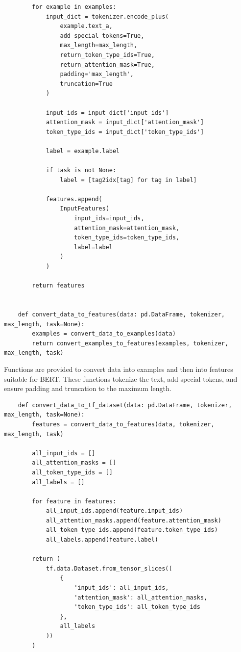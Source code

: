\documentclass{solutionclass} %
\begin{document}
\begin{solution}
\begin{lstlisting}
        for example in examples:
            input_dict = tokenizer.encode_plus(
                example.text_a,
                add_special_tokens=True,
                max_length=max_length,
                return_token_type_ids=True,
                return_attention_mask=True,
                padding='max_length',
                truncation=True
            )
            
            input_ids = input_dict['input_ids']
            attention_mask = input_dict['attention_mask']
            token_type_ids = input_dict['token_type_ids']
            
            label = example.label
            
            if task is not None:
                label = [tag2idx[tag] for tag in label]
            
            features.append(
                InputFeatures(
                    input_ids=input_ids,
                    attention_mask=attention_mask,
                    token_type_ids=token_type_ids,
                    label=label
                )
            )
            
        return features
    
    
    def convert_data_to_features(data: pd.DataFrame, tokenizer, max_length, task=None):
        examples = convert_data_to_examples(data)
        return convert_examples_to_features(examples, tokenizer, max_length, task)
    \end{lstlisting}
    
    Functions are provided to convert data into examples and then into features suitable for BERT. These functions tokenize the text, add special tokens, and ensure padding and truncation to the maximum length.
    
    \begin{lstlisting}
    def convert_data_to_tf_dataset(data: pd.DataFrame, tokenizer, max_length, task=None):
        features = convert_data_to_features(data, tokenizer, max_length, task)
        
        all_input_ids = []
        all_attention_masks = []
        all_token_type_ids = []
        all_labels = []
        
        for feature in features:
            all_input_ids.append(feature.input_ids)
            all_attention_masks.append(feature.attention_mask)
            all_token_type_ids.append(feature.token_type_ids)
            all_labels.append(feature.label)
            
        return (
            tf.data.Dataset.from_tensor_slices((
                {
                    'input_ids': all_input_ids,
                    'attention_mask': all_attention_masks,
                    'token_type_ids': all_token_type_ids
                },
                all_labels
            ))
        )
    \end{lstlisting}
    

\end{solution}
\end{document}
